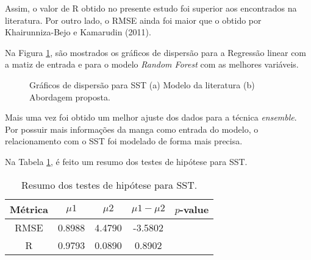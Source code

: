 Assim, o valor de R obtido no presente estudo foi superior aos encontrados na literatura. Por outro lado, o RMSE ainda foi maior que o obtido por Khairunniza-Bejo e Kamarudin (2011).

Na Figura \ref{fig:scatter_sst}, são mostrados os gráficos de dispersão para a Regressão linear com a matiz de entrada e para o modelo \textit{Random Forest} com as melhores variáveis.

\begin{figure}[H]
    \centering
    \caption{Gráficos de dispersão para SST (a) Modelo da literatura (b) Abordagem proposta.}\label{fig:scatter_sst}
\end{figure}

Mais uma vez foi obtido um melhor ajuste dos dados para a técnica \textit{ensemble}. Por possuir mais informações da manga como entrada do modelo, o relacionamento com o SST foi modelado de forma mais precisa.

\color{red}Na Tabela \ref{tbl:hip_sst}, é feito um resumo dos testes de hipótese para SST. \color{black}

\begin{table}[H]
    \centering
    \caption{Resumo dos testes de hipótese para SST.}
    \begin{tabular}{ccccc}
        \hline
         \textbf{Métrica} & $\mu1$ & $\mu2$ & $\mu1 - \mu2$ & $p$-value \\ \hline
         RMSE & 0.8988 & 4.4790   & -3.5802  & \\ 
         R    & 0.9793 & 0.0890    & 0.8902  & \\ \hline
    \end{tabular}
    \label{tbl:hip_sst}
\end{table}


